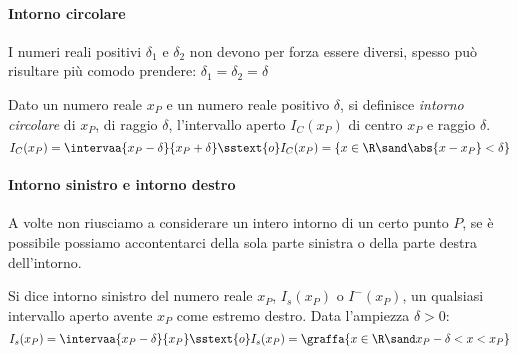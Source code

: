 \paragraph{Intorno circolare} 
I numeri reali positivi \(\delta_1\) e \(\delta_2\) non devono per forza 
essere diversi, spesso può risultare più comodo prendere:
\(\delta_1 = \delta_2 = \delta\)

\begin{newdef}{}{}
Dato un numero reale \(x_P\) e un numero reale positivo \(\delta\), si 
definisce \emph{intorno circolare} di \(x_P\), di raggio \(\delta\), 
l'intervallo aperto \(I_C(x_P)\) di centro \(x_P\) e raggio \(\delta\).
\[I_C(x_P)= \intervaa{x_P-\delta}{x_P+\delta} \sstext{o} 
  I_C(x_P) = \{x \in \R \sand \abs{x-x_P} < \delta\}\]
\end{newdef}

\begin{center} \intornocircolare \end{center}


\paragraph{Intorno sinistro e intorno destro}
A volte non riusciamo a considerare un intero intorno di un certo punto 
\(P\), se è possibile possiamo accontentarci della sola parte sinistra o 
della parte destra dell'intorno.

\begin{newdef}{}{}
Si dice intorno sinistro del numero reale \(x_P\), \(I_s(x_P)\) o 
\(I^-(x_P)\), un qualsiasi intervallo aperto avente \(x_P\) come estremo 
destro. 
Data l'ampiezza \(\delta > 0\):
\[I_s(x_P) = \intervaa{x_P-\delta}{x_P} \sstext{o} 
  I_s(x_P) = \graffa{x \in \R \sand x_P-\delta < x < x_P}\]
\end{newdef}

\begin{center}  \end{center}



